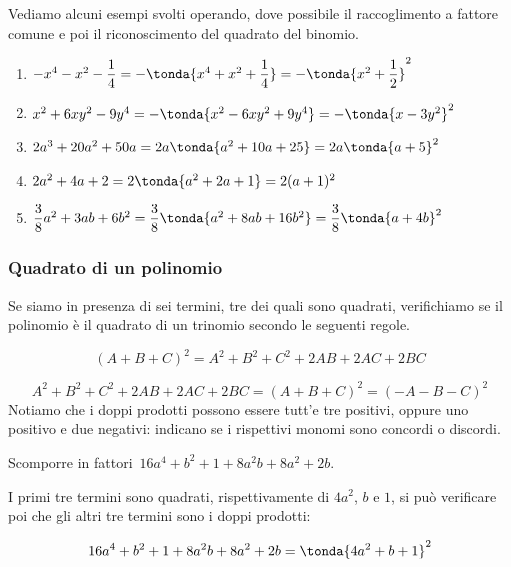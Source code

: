 \begin{esempio}{}{}
Vediamo alcuni esempi svolti operando, dove possibile il raccoglimento a 
fattore comune e poi il riconoscimento del quadrato del binomio.

\vspace{-.5em}
\begin{enumerate}
\item 
\(-x^4-x^2-\dfrac{1}{4}=-\tonda{x^4+x^2+\dfrac{1}{4}}=
  -\tonda{x^2+\dfrac{1}{2}}^{2}\)
\item 
\(x^2+6xy^{2}-9y^{4}=-\tonda{x^2-6xy^{2}+9y^{4}}=
  -\tonda{x-3y^{2}}^{2}\)
\item 
\(2a^{3}+20a^{2}+50a=2a\tonda{a^{2}+10a+25}=2a\tonda{a+5}^{2}\)
\item 
\(2a^{2}+4a+2=2\tonda{a^{2}+2a+1}=2(a+1)^{2}\)
\item 
\(\dfrac{3}{8}a^{2}+3ab+6b^{2}=
  \dfrac{3}{8}\tonda{a^{2}+8ab+16b^{2} }=
  \dfrac{3}{8}\tonda{a+4b}^{2}\)
\end{enumerate}
\end{esempio}


\subsubsection{Quadrato di un polinomio}
\label{subsubsec:divpol_quadpol}

Se siamo in presenza di sei termini, tre dei quali sono quadrati, 
verifichiamo se il polinomio è il quadrato di un trinomio secondo le 
seguenti regole.

\begin{equation*}
(A+B+C)^{2}=A^{2}+B^{2}+C^{2}+2AB+2AC+2BC
\end{equation*}

\vspace{-2.0em}
\begin{equation*}
A^{2}+B^{2}+C^{2}+2AB+2AC+2BC=(A+B+C)^{2}=(-A-B-C)^{2}
\end{equation*}
Notiamo che i doppi prodotti possono essere tutt'e tre positivi, oppure 
uno positivo e due negativi: indicano se i rispettivi monomi sono 
concordi o discordi.

\begin{esempio}{}{}
Scomporre in fattori~\(16a^{4}+b^{2}+1+8a^{2}b+8a^{2}+2b\).

I primi tre termini sono quadrati, rispettivamente di \(4a^{2}\), \(b\) 
e \(1\), si può verificare poi che gli altri tre termini sono i doppi 
prodotti:

\vspace{-1.0em}
\[16a^{4}+b^{2}+1+8a^{2}b+8a^{2}+2b=\tonda{4a^{2}+b+1}^{2}\]
\end{esempio}

